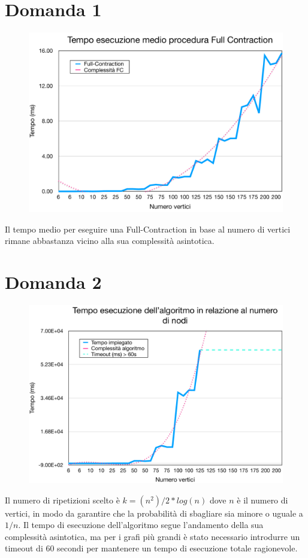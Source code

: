 \documentclass[a4paper]{article}
\begin{document}
\section{Domanda 1}
\begin{figure}[H]
	\centering
	\includegraphics[width=17cm]{fullcontraction}
	\label{fig:fullcontraction}
\end{figure}
Il tempo medio per eseguire una Full-Contraction in base al numero di vertici rimane abbastanza vicino alla sua complessità asintotica.

\section{Domanda 2}
\begin{figure}[H]
	\centering
	\includegraphics[width=17cm]{tempoesecvsnumnodi}
	\label{fig:tempoesecvsnumnodi}
\end{figure}
Il numero di ripetizioni scelto è $k = (n^2)/2 * log(n)$ dove $n$ è il numero di vertici, in modo da garantire che la probabilità di sbagliare sia minore o uguale a $1/n$.
Il tempo di esecuzione dell'algoritmo segue l'andamento della sua complessità asintotica, ma per i grafi più grandi è stato necessario introdurre un timeout di 60 secondi per mantenere un tempo di esecuzione totale ragionevole.
\end{document}
